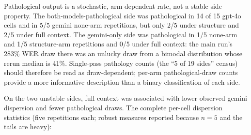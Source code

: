 \documentclass[11pt]{article}
\begin{document}
Pathological output is a stochastic, arm-dependent rate, not a stable side property. The both-models-pathological side was pathological in 14 of 15 gpt-4o cells and in 5/5 gemini none-arm repetitions, but only 2/5 under structure and 2/5 under full context. The gemini-only side was pathological in 1/5 none-arm and 1/5 structure-arm repetitions and 0/5 under full context: the main run's 283\% WER draw there was an unlucky draw from a bimodal distribution whose rerun median is 41\%. Single-pass pathology counts (the ``5 of 19 sides'' census) should therefore be read as draw-dependent; per-arm pathological-draw counts provide a more informative description than a binary classification of each side.

On the two unstable sides, full context was associated with lower observed gemini dispersion and fewer pathological draws. The complete per-cell dispersion statistics (five repetitions each; robust measures reported because $n = 5$ and the tails are heavy):
\end{document}
